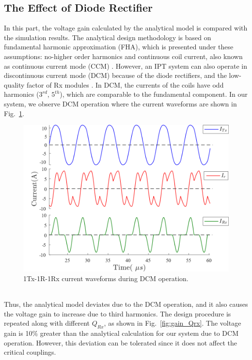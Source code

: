\documentclass[journal]{IEEEtran}
\begin{document}
\subsection{The Effect of Diode Rectifier }
In this part,  the voltage gain calculated by the analytical model is compared with the simulation results.  
The analytical design methodology is based on fundamental harmonic approximation (FHA), which is presented under these assumptions: no-higher order harmonics and continuous coil current, also known as continuous current mode (CCM) \cite{3rdharmonicEnhance}.
However, an IPT system can also operate in discontinuous current mode (DCM) because of the diode rectifiers, and the low-quality factor of Rx modules \cite{3rdharmonicIET}.
In DCM, the currents of the coils have odd harmonics ($3^{rd}$, $5^{th}$), which are comparable to the fundamental component.
In our system, we observe DCM operation where the current waveforms are shown in Fig.~\ref{fig:3rd_harmonic}. 
\begin{figure}[h]
    \centering
    \includegraphics[width=0.9\linewidth]{third_harmonic2.png}
    \caption{1Tx-1R-1Rx current waveforms during DCM operation.}
    \label{fig:3rd_harmonic}
\end{figure}
\\
Thus, the analytical model deviates due to the DCM operation, and it also causes the voltage gain to increase due to third harmonics.
The design procedure is repeated along with different $Q_{Rx}$, as shown in Fig.~\ref{fig:gain_Qrx}. 
The voltage gain is 10\% greater than the analytical calculation for our system due to DCM operation. 
However, this deviation can be tolerated since it does not affect the critical couplings.
\end{document}
